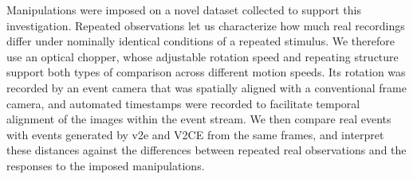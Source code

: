 \begin{itemize}
  Manipulations were imposed on a novel dataset collected to support this investigation. Repeated observations let us characterize how much real recordings differ under nominally identical conditions of a repeated stimulus. We therefore use an optical chopper, whose adjustable rotation speed and repeating structure support both types of comparison across different motion speeds. Its rotation was recorded by an event camera that was spatially aligned with a conventional frame camera, and automated timestamps were recorded to facilitate temporal alignment of the images within the event stream. We then compare real events with events generated by v2e and V2CE from the same frames, and interpret these distances against the differences between repeated real observations and the responses to the imposed manipulations. 
  



  

\end{itemize}
